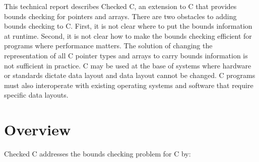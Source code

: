 This technical report describes Checked C, an extension to C that provides
bounds checking for pointers and arrays. There are two obstacles to
adding bounds checking to C. First, it is not clear where to put the
bounds information at runtime. Second, it is not clear how to make the
bounds checking efficient for programs where performance matters. The
solution of changing the representation of all C pointer types and
arrays to carry bounds information is not sufficient in practice. C may
be used at the base of systems where hardware or standards dictate data
layout and data layout cannot be changed. C programs must also
interoperate with existing operating systems and software that require
specific data layouts.

\section{Overview}
Checked C addresses the bounds checking problem for C by:

